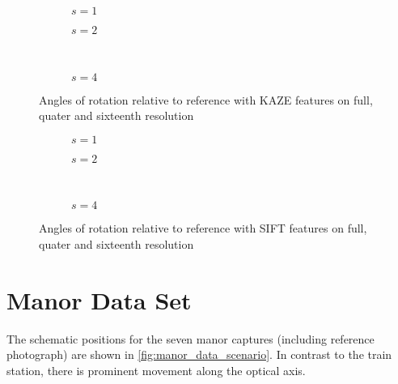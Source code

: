\begin{figure}
   \begin{subfigure}{.5\linewidth}
      \centering      
      
      \label{fig:train_KAZE_rotation_1}
      \caption{$s=1$}
   \end{subfigure}
   \quad
   \begin{subfigure}{.5\linewidth}
      \centering      
      
      \label{fig:train_KAZE_rotation_2}
      \caption{$s=2$}
   \end{subfigure}\\[3ex]
   \begin{subfigure}{\linewidth}
      \centering      
      
      \label{fig:train_KAZE_rotation_4}
      \caption{$s=4$}
   \end{subfigure}

   \caption{Angles of rotation relative to reference with
   KAZE features on full, quater and sixteenth resolution}
\end{figure}

\begin{figure}
   \begin{subfigure}{.5\linewidth}
      \centering      
      
      \label{fig:train_SIFT_rotation_1}
      \caption{$s=1$}
   \end{subfigure}
   \quad
   \begin{subfigure}{.5\linewidth}
      \centering      
      
      \label{fig:train_SIFT_rotation_2}
      \caption{$s=2$}
   \end{subfigure}\\[3ex]
   \begin{subfigure}{\linewidth}
      \centering      
      
      \label{fig:train_SIFT_rotation_4}
      \caption{$s=4$}
   \end{subfigure}

   \caption{Angles of rotation relative to reference with
   SIFT features on full, quater and sixteenth resolution}
\end{figure}

\section{Manor Data Set}

The schematic positions for the seven manor captures (including reference
photograph) are shown in \autoref{fig:manor_data_scenario}. In contrast to the
train station, there is prominent movement along the optical axis.

